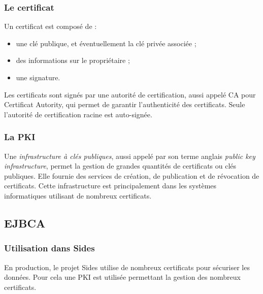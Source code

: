 \subsubsection{Le certificat}

Un certificat est composé de :
\begin{itemize}
	\item une clé publique, et éventuellement la clé privée associée ;
	\item des informations sur le propriétaire ;
	\item une signature.
\end{itemize}

Les certificats sont signés par une autorité de certification, aussi appelé CA pour Certificat Autority, qui permet de garantir l'authenticité des certificats.
Seule l'autorité de certification racine est auto-signée.


\subsubsection{La PKI}

Une \textit{infrastructure à clés publiques}, aussi appelé par son terme anglais \textit{public key infrastructure}, permet la gestion de grandes quantités de certificats ou clés publiques.
Elle fournie des services de création, de publication et de révocation de certificats.
Cette infrastructure est principalement dans les systèmes informatiques utilisant de nombreux certificats.


\subsection{EJBCA}


\subsubsection{Utilisation dans Sides}

En production, le projet Sides utilise de nombreux certificats pour sécuriser les données.
Pour cela une PKI est utilisée permettant la gestion des nombreux certificats.

